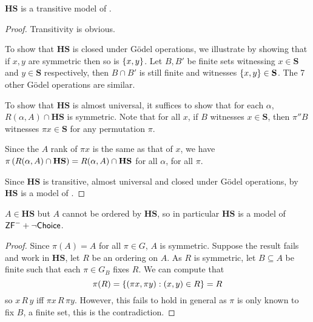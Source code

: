 \begin{theorem} \label{theorem:f-k-model-zfminus}
    \(\mathbf{HS}\) is a transitive model of \ZFminus.
\end{theorem}
\begin{proof}
    Transitivity is obvious.

    To show that \(\mathbf{HS}\) is closed under Gödel operations,
    we illustrate by showing that if \(x,y\) are symmetric then so is \({\left\{ x,y \right\}}\).
    Let \(B, B'\) be finite sets witnessing \(x\in \mathbf{S}\) and \(y\in\mathbf{S}\) respectively,
    then \(B\cap B'\) is still finite and witnesses \({\left\{ x,y \right\}} \in \mathbf{S}\).
    The 7 other Gödel operations are similar.

    To show that \(\mathbf{HS}\) is almost universal,
    it suffices to show that for each \(\alpha\),
    \(R(\alpha,A) \cap \mathbf{HS}\) is symmetric.
    Note that for all \(x\), if \(B\) witnesses \(x\in \mathbf{S}\),
    then \(\pi''B\) witnesses \(\pi x\in \mathbf{S}\) for any permutation \(\pi\).

    Since the \(A\) rank of \(\pi x\) is the same as that of \(x\),
    we have \(\pi\left(R(\alpha,A) \cap \mathbf{HS}\right) = R(\alpha,A) \cap \mathbf{HS}\)
    for all \(\alpha\), for all \(\pi\).

    Since \(\mathbf{HS}\) is transitive, almost universal and closed under Gödel operations, by  \(\mathbf{HS}\) is a model of \ZFminus.
\end{proof}

\begin{theorem}
    \(A\in\mathbf{HS}\) but \(A\) cannot be ordered by \(\mathbf{HS}\), so in particular
    \(\mathbf{HS}\) is a model of \(\mbox{\normalfont \textsf{ZF}}^- + \lnot{\normalfont\textsf{Choice}}\).
\end{theorem}
\begin{proof}
    Since \(\pi(A) = A\) for all \(\pi\in G\), \(A\) is symmetric.
    Suppose the result fails and work in \(\mathbf{HS}\), let \(R\) be an ordering on \(A\).
    As \(R\) is symmetric, let \(B\subseteq A\) be finite such that each \(\pi\in G_B\) fixes \(R\).
    We can compute that
    \[ \pi(R) = {\left\{ \left(\pi x,\pi y\right): \left(x,y\right)\in R \right\}} = R \]
    so \(x\,R\,y\) iff \(\pi x\,R\,\pi y\).
    However, this fails to hold in general as \(\pi\) is only known to fix \(B\), a finite set, this is the contradiction.
\end{proof}

